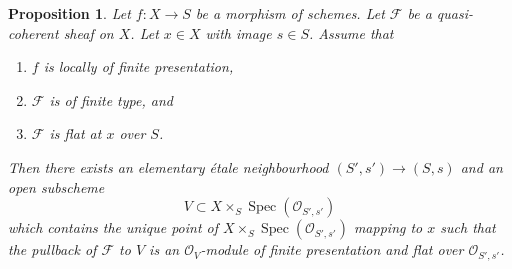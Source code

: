 \documentclass{amsart}
\theoremstyle{plain}
\newtheorem{proposition}[subsection]{Proposition}
\theoremstyle{definition}
\theoremstyle{remark}
\numberwithin{equation}{subsection}
\def\Spec{\mathop{\mathrm{Spec}}}
\begin{document}
\begin{proposition}
\label{proposition-finite-type-flat-at-point}
Let $f : X \to S$ be a morphism of schemes.
Let $\mathcal{F}$ be a quasi-coherent sheaf on $X$.
Let $x \in X$ with image $s \in S$.
Assume that
\begin{enumerate}
\item $f$ is locally of finite presentation,
\item $\mathcal{F}$ is of finite type, and
\item $\mathcal{F}$ is flat at $x$ over $S$.
\end{enumerate}
Then there exists an elementary \'etale neighbourhood $(S', s') \to (S, s)$
and an open subscheme
$$
V \subset X \times_S \Spec(\mathcal{O}_{S', s'})
$$
which contains the unique point of
$X \times_S \Spec(\mathcal{O}_{S', s'})$ mapping to $x$
such that the pullback of $\mathcal{F}$ to $V$ is an $\mathcal{O}_V$-module
of finite presentation and flat over $\mathcal{O}_{S', s'}$.
\end{proposition}
\end{document}
